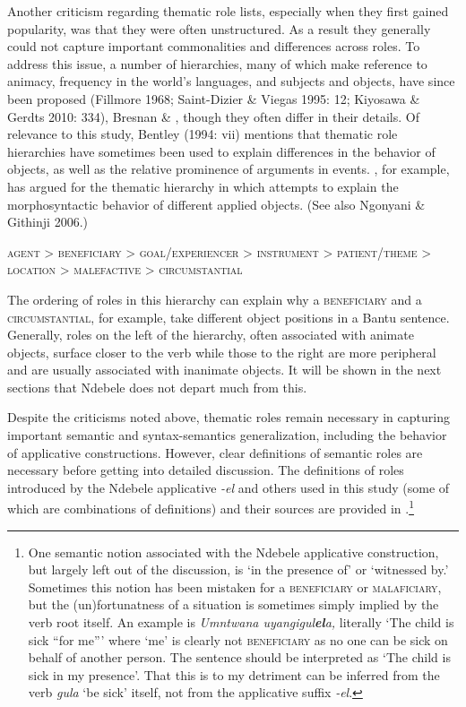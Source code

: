 \documentclass[output=paper]{langsci/langscibook}
\begin{document}
Another criticism regarding thematic role lists, especially when they first gained popularity, was that they were often unstructured. As a result they generally could not capture important commonalities and differences across roles. To address this issue, a number of hierarchies, many of which make reference to animacy, frequency in the world’s languages, and subjects and objects, have since been proposed (Fillmore 1968; Saint-Dizier \& Viegas 1995: 12; Kiyosawa \& Gerdts 2010: 334), Bresnan \& \citet{Kanerva1989}, though they often differ in their details. Of relevance to this study, Bentley (1994: vii) mentions that thematic role hierarchies have sometimes been used to explain differences in the behavior of objects, as well as the relative prominence of arguments in events. \citet[129]{Mchombo2004}, for example, has argued for the thematic hierarchy in  which attempts to explain the morphosyntactic behavior of different applied objects. (See also Ngonyani \& Githinji 2006.)

\ea
\textsc{agent > beneficiary > goal/experiencer > instrument > patient/theme > location > malefactive > circumstantial}\\
\z

The ordering of roles in this hierarchy can explain why a \textsc{beneficiary} and a \textsc{circumstantial}, for example, take different object positions in a Bantu sentence. Generally, roles on the left of the hierarchy, often associated with animate objects, surface closer to the verb while those to the right are more peripheral and are usually associated with inanimate objects. It will be shown in the next sections that Ndebele does not depart much from this.

 Despite the criticisms noted above, thematic roles remain necessary in capturing important semantic and syntax-semantics generalization, including the behavior of applicative constructions. However, clear definitions of semantic roles are necessary before getting into detailed discussion. The definitions of roles introduced by the Ndebele applicative \textit{-el} and others used in this study (some of which are combinations of definitions) and their sources are provided in .\footnote {One semantic notion associated with the Ndebele applicative construction, but largely left out of the discussion, is ‘in the presence of’ or ‘witnessed by.’ Sometimes this notion has been mistaken for a \textsc{beneficiary} or \textsc{malaficiary}, but the (un)fortunatness of a situation is sometimes simply implied by the verb root itself. An example is \textit{Umntwana uyangigul}\textbf{\textit{el}}\textit{a,} literally ‘The child is sick “for me”’ where ‘me’ is clearly not \textsc{beneficiary} as no one can be sick on behalf of another person. The sentence should be interpreted as ‘The child is sick in my presence’. That this is to my detriment can be inferred from the verb \textit{gula} ‘be sick’ itself, not from the applicative suffix \textit{-el}.} 
\end{document}
